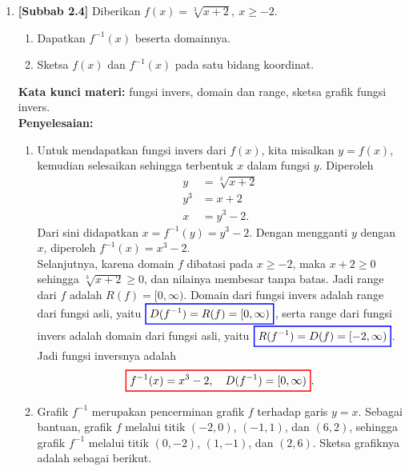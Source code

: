 \documentclass[10pt,openany,a4paper]{article}
\theoremstyle{definition}
\theoremstyle{definition}
\theoremstyle{plain}
\newenvironment{jawab}[2][tes]{%
\par\noindent\textbf{Kata kunci materi:} #1.\\
\textbf{Penyelesaian:} #2%
}{}
\begin{document}
\begin{enumerate}
    \item \textbf{[Subbab 2.4]} Diberikan $f(x)=\sqrt[3]{x+2},\ x\geq -2$.
    \begin{enumerate}
        \item Dapatkan $f^{-1}(x)$ beserta domainnya.
        \item Sketsa $f(x)$ dan $f^{-1}(x)$ pada satu bidang koordinat.
    \end{enumerate}
    \begin{jawab}[fungsi invers, domain dan range, sketsa grafik fungsi invers]{
        \begin{enumerate}
            \item Untuk mendapatkan fungsi invers dari $f(x)$, kita misalkan $y=f(x)$, kemudian selesaikan sehingga terbentuk $x$ dalam fungsi $y$. Diperoleh
            \begin{align*}
                y &= \sqrt[3]{x+2}\\
                y^3 &= x+2\\
                x &= y^3 - 2.
            \end{align*}
            Dari sini didapatkan $x = f^{-1}(y) = y^3 - 2$. Dengan mengganti $y$ dengan $x$, diperoleh $f^{-1}(x) = x^3 - 2$.\\
            Selanjutnya, karena domain $f$ dibatasi pada $x\geq -2$, maka $x+2\geq 0$ sehingga $\sqrt[3]{x+2}\geq 0$, dan nilainya membesar tanpa batas. Jadi range dari $f$ adalah $R(f)=[0,\infty)$. Domain dari fungsi invers adalah range dari fungsi asli, yaitu $\colorlet{oldcolor}{.}
        \color{blue}
        \setlength{\fboxrule}{1pt} \boxed{\color{oldcolor}D(f^{-1}) = R(f) = [0, \infty)}\color{oldcolor}$, serta range dari fungsi invers adalah domain dari fungsi asli, yaitu $\colorlet{oldcolor}{.}
        \color{blue}
        \setlength{\fboxrule}{1pt} \boxed{\color{oldcolor}R(f^{-1}) = D(f) = [-2, \infty)}\color{oldcolor}$. Jadi fungsi inversnya adalah
            \begin{align*}
                \colorlet{oldcolor}{.}
        \color{red}
        \setlength{\fboxrule}{1pt} \boxed{\color{oldcolor}f^{-1}(x) = x^3 - 2,\quad D(f^{-1})=[0,\infty)}\color{oldcolor}.
            \end{align*}
            \item Grafik $f^{-1}$ merupakan pencerminan grafik $f$ terhadap garis $y=x$. Sebagai bantuan, grafik $f$ melalui titik $(-2,0)$, $(-1,1)$, dan $(6,2)$, sehingga grafik $f^{-1}$ melalui titik $(0,-2)$, $(1,-1)$, dan $(2,6)$. Sketsa grafiknya adalah sebagai berikut.

\end{enumerate}}
\end{jawab}
\end{enumerate}
\end{document}
